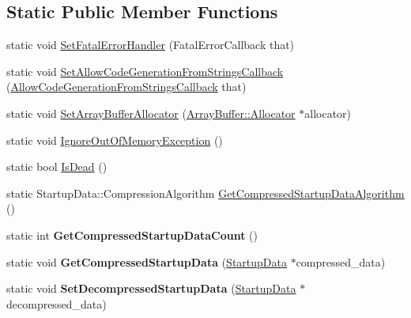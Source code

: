 \subsection*{Static Public Member Functions}
\begin{DoxyCompactItemize}
\item 
static void \hyperlink{classv8_1_1_v8_ab386f81a6d58dcf481d00446e8d15c9e}{Set\+Fatal\+Error\+Handler} (Fatal\+Error\+Callback that)
\item 
static void \hyperlink{classv8_1_1_v8_ad4abec314050af6e68df3a339634293e}{Set\+Allow\+Code\+Generation\+From\+Strings\+Callback} (\hyperlink{namespacev8_a521d909ec201742a1cb35d50a8e2a3c2}{Allow\+Code\+Generation\+From\+Strings\+Callback} that)
\item 
static void \hyperlink{classv8_1_1_v8_abc40950a39f8cb6946dc8a1ad41eea84}{Set\+Array\+Buffer\+Allocator} (\hyperlink{classv8_1_1_array_buffer_1_1_allocator}{Array\+Buffer\+::\+Allocator} $\ast$allocator)
\item 
static void \hyperlink{classv8_1_1_v8_a1058ff39b32a17976df1e2b75c3d1cb4}{Ignore\+Out\+Of\+Memory\+Exception} ()
\item 
static bool \hyperlink{classv8_1_1_v8_a0d5593ecf0d41035e4d9ee512119f0b7}{Is\+Dead} ()
\item 
static Startup\+Data\+::\+Compression\+Algorithm \hyperlink{classv8_1_1_v8_a6d1b72d0cecdc64d0a0b8e784025b625}{Get\+Compressed\+Startup\+Data\+Algorithm} ()
\item 
\hypertarget{classv8_1_1_v8_ab598cfc79ebbc85fdeb2171b84ce53e6}{}static int {\bfseries Get\+Compressed\+Startup\+Data\+Count} ()\label{classv8_1_1_v8_ab598cfc79ebbc85fdeb2171b84ce53e6}

\item 
\hypertarget{classv8_1_1_v8_a736d6ddfdbbd72ca5838f931002334df}{}static void {\bfseries Get\+Compressed\+Startup\+Data} (\hyperlink{classv8_1_1_startup_data}{Startup\+Data} $\ast$compressed\+\_\+data)\label{classv8_1_1_v8_a736d6ddfdbbd72ca5838f931002334df}

\item 
\hypertarget{classv8_1_1_v8_a46d5618689f239b70425b8d7917cebf5}{}static void {\bfseries Set\+Decompressed\+Startup\+Data} (\hyperlink{classv8_1_1_startup_data}{Startup\+Data} $\ast$decompressed\+\_\+data)\label{classv8_1_1_v8_a46d5618689f239b70425b8d7917cebf5}


\end{DoxyCompactItemize}
